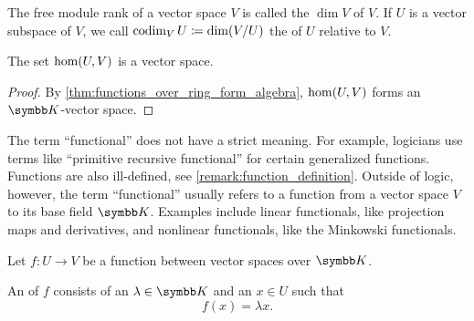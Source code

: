 \begin{definition}\label{def:vector_space_dimension}
  The free module rank of a vector space \( V \) is called the  \( \dim V \) of \( V \). If \( U \) is a vector subspace of \( V \), we call \( \operatorname{co}\!\dim_V U \coloneqq \dim(V/U) \) the  of \( U \) relative to \( V \).
\end{definition}

\begin{proposition}\label{thm:linear_maps_form_algebra}
  The set \( \operatorname{hom}(U, V) \) is a vector space.
\end{proposition}
\begin{proof}
  By \cref{thm:functions_over_ring_form_algebra}, \( \operatorname{hom}(U, V) \) forms an \( \K \)-vector space.
\end{proof}

\begin{remark}\label{remark:functional}
  The term \enquote{functional} does not have a strict meaning. For example, logicians use terms like \enquote{primitive recursive functional} for certain generalized functions. Functions are also ill-defined, see \cref{remark:function_definition}. Outside of logic, however, the term \enquote{functional} usually refers to a function from a vector space \( V \) to its base field \( \K \). Examples include linear functionals, like projection maps and derivatives, and nonlinear functionals, like the Minkowski functionals.
\end{remark}

\begin{definition}\label{def:eigenpair}
  Let \( f: U \to V \) be a function between vector spaces over \( \K \).

  An  of \( f \) consists of an  \( \lambda \in \K \) and an  \( x \in U \) such that
  \begin{equation*}
    f(x) = \lambda x.
  \end{equation*}
\end{definition}
